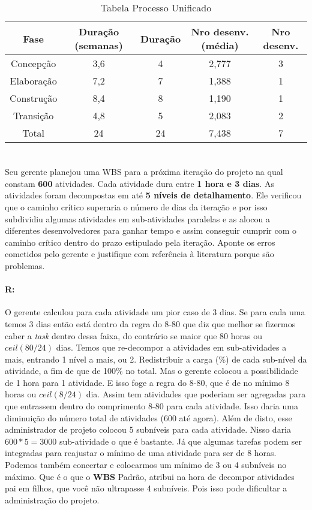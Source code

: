 \documentclass[10pt, a4paper]{report}
\begin{document}
\begin{table}[ht!]
  \centering
  \begin{tabular}{|c|c|c|c|c|}
    \hline Fase & Duração (semanas) & Duração & Nro desenv. (média) & Nro desenv. \\ 
    \hline Concepção & 3,6 & 4 & 2,777  & 3 \\ 
    \hline Elaboração & 7,2 & 7 & 1,388  & 1 \\ 
    \hline Construção & 8,4 & 8 & 1,190  & 1 \\ 
    \hline Transição & 4,8 & 5 & 2,083  & 2 \\ 
    \hline Total & 24 & 24 & 7,438  & 7 \\ 
    \hline
  \end{tabular}
  \caption{Tabela Processo Unificado}
\end{table}

\section{}

\qquad Seu gerente planejou uma WBS para a próxima iteração do projeto na qual
constam \textbf{600} atividades. Cada atividade dura entre \textbf{1 hora e 3
dias}. As atividades foram decompostas em até \textbf{5 níveis de detalhamento}.
Ele verificou que o caminho crítico superaria o número de dias da iteração e por
isso subdividiu algumas atividades em sub-atividades paralelas e as alocou a
diferentes desenvolvedores para ganhar tempo e assim conseguir cumprir com o
caminho crítico dentro do prazo estipulado pela iteração. Aponte os erros
cometidos pelo gerente e justifique com referência à literatura porque são
problemas.


\paragraph{R:}

O gerente calculou para cada atividade um pior caso de 3 dias. Se para cada uma
temos 3 dias então está dentro da regra do 8-80 que diz que melhor se fizermos
caber a \textit{task} dentro dessa faixa, do contrário se maior que 80 horas ou
$ceil(80/24)$ dias. Temos que re-decompor a atividades em sub-atividades a mais,
entrando 1 nível a mais, ou 2. Redistribuir a carga (\%) de cada sub-nível da
atividade, a fim de que de 100\% no total. Mas o gerente colocou a possibilidade
de 1 hora para 1 atividade. E isso foge a regra do 8-80, que é de no mínimo 8
horas ou $ceil(8/24)$ dia. Assim tem atividades que poderiam ser agregadas para
que entrassem dentro do comprimento 8-80 para cada atividade. Isso daria uma
diminuição do número total de atividades (600 até agora). Além de disto, esse
administrador de projeto colocou 5 subníveis para cada atividade. Nisso daria
$600*5=3000$ sub-atividade o que é bastante. Já que algumas tarefas podem ser
integradas para reajustar o mínimo de uma atividade para ser de 8 horas. Podemos
também concertar e colocarmos um mínimo de 3 ou 4 subníveis no máximo. Que é o
que o \textbf{WBS} Padrão, atribui na hora de decompor atividades pai em filhos,
que você não ultrapasse 4 subníveis. Pois isso pode dificultar a administração
do projeto.
\end{document}
